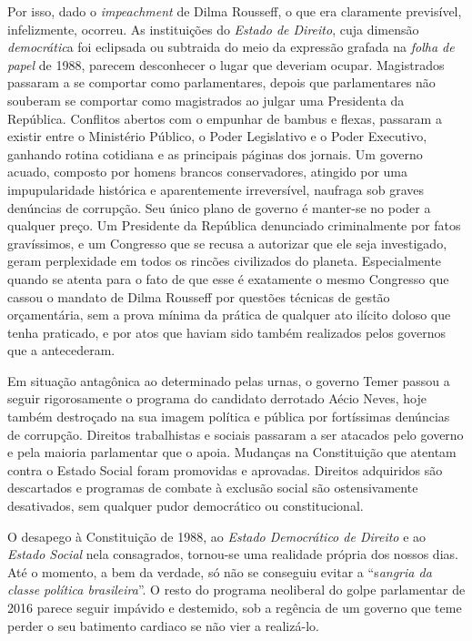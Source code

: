 Por isso, dado o \emph{impeachment} de Dilma Rousseff, o que era
claramente previsível, infelizmente, ocorreu. As instituições do
\emph{Estado de Direito}, cuja dimensão \emph{democrátic}a foi eclipsada
ou subtraida do meio da expressão grafada na \emph{folha de papel} de
1988, parecem desconhecer o lugar que deveriam ocupar. Magistrados
passaram a se comportar como parlamentares, depois que parlamentares não
souberam se comportar como magistrados ao julgar uma Presidenta da
República. Conflitos abertos com o empunhar de bambus e flexas, passaram
a existir entre o Ministério Público, o Poder Legislativo e o Poder
Executivo, ganhando rotina cotidiana e as principais páginas dos
jornais. Um governo acuado, composto por homens brancos conservadores,
atingido por uma impupularidade histórica e aparentemente irreversível,
naufraga sob graves denúncias de corrupção. Seu único plano de governo é
manter-se no poder a qualquer preço. Um Presidente da República
denunciado criminalmente por fatos gravíssimos, e um Congresso que se
recusa a autorizar que ele seja investigado, geram perplexidade em todos
os rincões civilizados do planeta. Especialmente quando se atenta para o
fato de que esse é exatamente o mesmo Congresso que cassou o mandato de
Dilma Rousseff por questões técnicas de gestão orçamentária, sem a prova
mínima da prática de qualquer ato ilícito doloso que tenha praticado, e
por atos que haviam sido também realizados pelos governos que a
antecederam.

Em situação antagônica ao determinado pelas urnas, o governo Temer
passou a seguir rigorosamente o programa do candidato derrotado Aécio
Neves, hoje também destroçado na sua imagem política e pública por
fortíssimas denúncias de corrupção. Direitos trabalhistas e sociais
passaram a ser atacados pelo governo e pela maioria parlamentar que o
apoia. Mudanças na Constituição que atentam contra o Estado Social foram
promovidas e aprovadas. Direitos adquiridos são descartados e programas
de combate à exclusão social são ostensivamente desativados, sem
qualquer pudor democrático ou constitucional.

O desapego à Constituição de 1988, ao \emph{Estado Democrático de
Direito} e ao \emph{Estado Social} nela consagrados, tornou-se uma
realidade própria dos nossos dias. Até o momento, a bem da verdade, só
não se conseguiu evitar a ``s\emph{angria da classe política
brasileira}''. O resto do programa neoliberal do golpe parlamentar de
2016 parece seguir impávido e destemido, sob a regência de um governo
que teme perder o seu batimento cardiaco se não vier a realizá-lo.

